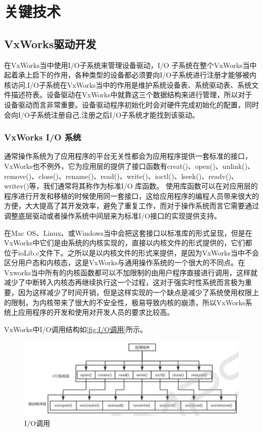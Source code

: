 	


\section{关键技术}

\subsection{VxWorks驱动开发}
	
	在VxWorks当中使用I/O子系统来管理设备驱动，I/O 子系统在整个VxWorks当中起着承上启下的作用，各种类型的设备都必须要向I/O子系统进行注册才能够被内核访问,I/O子系统在VxWorks当中的作用是维护系统设备表、系统驱动表、系统文件描述符表\cite{VxWorks内核解读}\cite{曹桂平2011VxWorks}。设备驱动在VxWorks中就靠这三个数据结构来进行管理，所以对于设备驱动而言非常重要。设备驱动程序初始化时会对硬件完成初始化的配置，同时会向I/O子系统注册自己,注册之后I/O子系统才能找到该驱动。

\subsubsection{VxWorks I/O 系统}
	通常操作系统为了应用程序的平台无关性都会为应用程序提供一套标准的接口，VxWorks也不例外，它为应用层的提供了接口函数有creat()、open()、unlink()、remove()、close()、rename()、read()、write()、ioctl()、lseek()、readv()、writev()等\cite{陈洋2007VxWorks}\cite{Wu2008Implementation}\cite{Zhang2010Design}，我们通常将其称作为标准I/O 库函数。
	使用库函数可以在对应用层的程序进行开发和移植的时候使用同一套接口，这给应用程序的编程人员带来很大的方便，大大提高了其开发效率，避免了重复工作，而对于操作系统而言它需要通过调整底层驱动或者操作系统中间层来为标准I/O接口的实现提供支持。
	
	在Mac OS、Linux、或Windows当中会把这套接口以标准库的形式呈现，但是在VxWorks中它们是由系统的内核实现的，直接以内核文件的形式提供的，它们都位于ioLib.c文件下\cite{VxWorks内核解读}。之所以是以内核文件的形式来提供，是因为VxWorks当中不会区分用户态和内核态，这是VxWorks与通用操作系统的一个很大的不同点。在Vxworks当中所有的内核函数都可以不加限制的由用户程序直接进行调用，这样就减少了中断转入内核态再继续执行这一个过程，这对于强实时性系统而言极为重要，因为这样减少了时间开销，但是这样实现的一个缺点是减少了系统使用权限上的限制，为内核带来了很大的不安全性，极易导致内核的崩溃，所以VxWorks系统上应用程序的开发和使用对开发人员的要求比较高。
		
	VxWorks中I/O调用结构如\autoref{fig:I/O调用}所示。
	\begin{figure}[!h]
\centering
\includegraphics[width=1.0\textwidth]{./graphics/IOCall.pdf}
\caption{I/O调用}\label{fig:I/O调用}
\end{figure}

